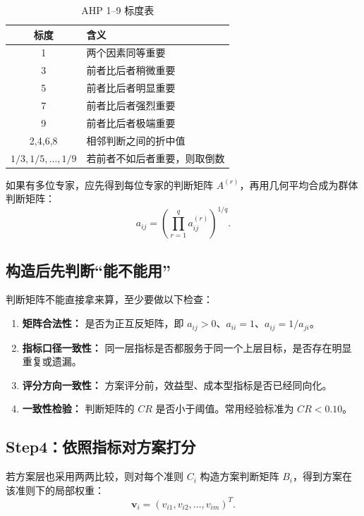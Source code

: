 \documentclass[UTF8,zihao=-4,fontset=none]{ctexart}
\begin{document}
\begin{table}[H]
\centering
\caption{AHP 1--9 标度表}
\label{tab:scale}
\begin{tabular}{cl}
\toprule
标度 & 含义\\
\midrule
1 & 两个因素同等重要\\
3 & 前者比后者稍微重要\\
5 & 前者比后者明显重要\\
7 & 前者比后者强烈重要\\
9 & 前者比后者极端重要\\
2,4,6,8 & 相邻判断之间的折中值\\
$1/3,1/5,\ldots,1/9$ & 若前者不如后者重要，则取倒数\\
\bottomrule
\end{tabular}
\end{table}

如果有多位专家，应先得到每位专家的判断矩阵 $A^{(r)}$，再用几何平均合成为群体判断矩阵：
\begin{equation}
  a_{ij}=\left(\prod_{r=1}^{q}a_{ij}^{(r)}\right)^{1/q} .
\end{equation}

\subsection{构造后先判断“能不能用”}
判断矩阵不能直接拿来算，至少要做以下检查：
\begin{enumerate}[leftmargin=2.2em]
  \item \textbf{矩阵合法性：} 是否为正互反矩阵，即 $a_{ij}>0$、$a_{ii}=1$、$a_{ij}=1/a_{ji}$。
  \item \textbf{指标口径一致性：} 同一层指标是否都服务于同一个上层目标，是否存在明显重复或遗漏。
  \item \textbf{评分方向一致性：} 方案评分前，效益型、成本型指标是否已经同向化。
  \item \textbf{一致性检验：} 判断矩阵的 $CR$ 是否小于阈值。常用经验标准为 $CR<0.10$。
\end{enumerate}

\subsection{Step4：依照指标对方案打分}
若方案层也采用两两比较，则对每个准则 $C_i$ 构造方案判断矩阵 $B_i$，得到方案在该准则下的局部权重：
\begin{equation}
  \bm v_i=(v_{i1},v_{i2},\ldots,v_{im})^T .
\end{equation}
\end{document}
